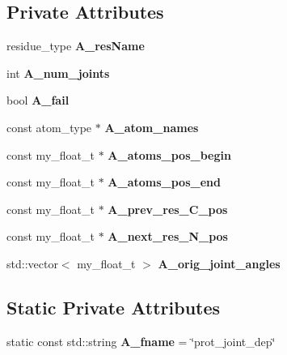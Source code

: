 \subsection*{Private Attributes}
\begin{CompactItemize}
\item 
residue\_\-type \textbf{A\_\-res\-Name}\label{classSimSite3D_1_1residue__joints_21497636be77aa78b659e24b4d60e350}

\item 
int \textbf{A\_\-num\_\-joints}\label{classSimSite3D_1_1residue__joints_bf4d7f0a200401c847a809f999ae2971}

\item 
bool \textbf{A\_\-fail}\label{classSimSite3D_1_1residue__joints_774042aeeddefb94221a85aef2a03eae}

\item 
const atom\_\-type $\ast$ \textbf{A\_\-atom\_\-names}\label{classSimSite3D_1_1residue__joints_5a33d4f7989653cd612fe8b6295e40a8}

\item 
const my\_\-float\_\-t $\ast$ \textbf{A\_\-atoms\_\-pos\_\-begin}\label{classSimSite3D_1_1residue__joints_36c3c3466b89a15fa509d32a83d97b9b}

\item 
const my\_\-float\_\-t $\ast$ \textbf{A\_\-atoms\_\-pos\_\-end}\label{classSimSite3D_1_1residue__joints_ae2d9bc7ca8ff776d6e1f46feb0c3f49}

\item 
const my\_\-float\_\-t $\ast$ \textbf{A\_\-prev\_\-res\_\-C\_\-pos}\label{classSimSite3D_1_1residue__joints_8fd8e62a05624a315c33809c1cf1bfb0}

\item 
const my\_\-float\_\-t $\ast$ \textbf{A\_\-next\_\-res\_\-N\_\-pos}\label{classSimSite3D_1_1residue__joints_c695ff8ec00bd34f913a43fe8087e7fa}

\item 
std::vector$<$ my\_\-float\_\-t $>$ \textbf{A\_\-orig\_\-joint\_\-angles}\label{classSimSite3D_1_1residue__joints_e0ccbfe40d2d00392c4d921188ad6361}

\end{CompactItemize}
\subsection*{Static Private Attributes}
\begin{CompactItemize}
\item 
static const std::string \textbf{A\_\-fname} = \char`\"{}prot\_\-joint\_\-dep\char`\"{}\label{classSimSite3D_1_1residue__joints_e39bf1e8f574aad44de1a4614d83a659}

\end{CompactItemize}


